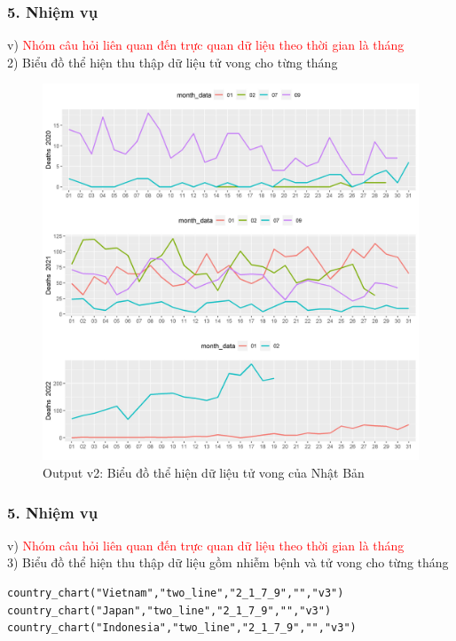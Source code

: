 \documentclass[english,10pt,table]{beamer}
\begin{document}
\begin{frame}[fragile]
\frametitle{5.  Nhiệm vụ}
v) \textcolor{red}{Nhóm câu hỏi liên quan đến trực quan dữ liệu theo thời gian là tháng}\\
    2) Biểu đồ thể hiện thu thập dữ liệu tử vong cho từng tháng
	\begin{figure}[h!]
	\begin{center}
		    \includegraphics[scale = 0.28]{Images/V/v2 Japan .jpeg}
		     \caption{Output v2: Biểu đồ thể hiện dữ liệu tử vong của Nhật Bản}
		\end{center}
		\end{figure}
\end{frame}

\begin{frame}[fragile]
\frametitle{5.  Nhiệm vụ}
v) \textcolor{red}{Nhóm câu hỏi liên quan đến trực quan dữ liệu theo thời gian là tháng}\\
    3) Biểu đồ thể hiện thu thập dữ liệu gồm nhiễm bệnh và tử vong cho từng tháng
    	\begin{lstlisting}[frame=single,basicstyle=\tiny]  
country_chart("Vietnam","two_line","2_1_7_9","","v3")
country_chart("Japan","two_line","2_1_7_9","","v3")
country_chart("Indonesia","two_line","2_1_7_9","","v3")
		\end{lstlisting}	
\end{frame}
\end{document}
